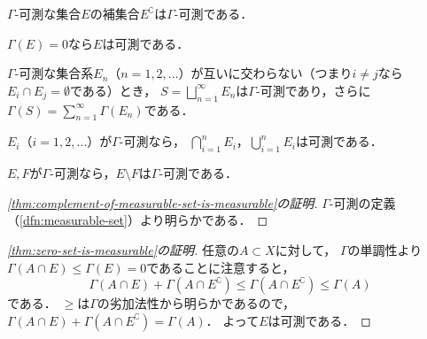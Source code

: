 \documentclass[../sotsu.tex]{subfiles}
\begin{document}
\begin{proposition}
    \label{thm:complement-of-measurable-set-is-measurable}
    $Γ$-可測な集合$E$の補集合$E^{\complement}$は$Γ$-可測である．
\end{proposition}


\begin{proposition}
    \label{thm:zero-set-is-measurable}
    $Γ (E) = 0$なら$E$は可測である．
\end{proposition}


\begin{proposition}
    \label{thm:disjoint-union-of-measurable-sets-is-measurable}
    $Γ$-可測な集合系$E_n$（$n = 1, 2, \dots$）が互いに交わらない（つまり$i \neq j$なら$E_i \cap E_j = \emptyset$である）とき，
    $S = \bigsqcup_{n=1}^{\infty} E_n$は$Γ$-可測であり，さらに$Γ(S) = \sum_{n=1}^{\infty} Γ(E_n)$である\cite[定理5.3]{ito-lebesgue-1963}．
\end{proposition}


\begin{proposition}
    \label{thm:finite-union-and-intersection-of-measurable-sets-are-measurable}
    $E_i$（$i = 1, 2, \dots$）が$Γ$-可測なら，
    $\bigcap_{i=1}^{n} E_i$，$\bigcup_{i=1}^{n} E_i$は可測である．
\end{proposition}


\begin{corollary}
    \label{thm:countable-set-minus-countable-set-is-countable}
    $E, F$が$Γ$-可測なら，$E \setminus F$は$Γ$-可測である．
\end{corollary}




\begin{proof}[\cref{thm:complement-of-measurable-set-is-measurable}の証明]
    $Γ$-可測の定義（\cref{dfn:measurable-set}）より明らかである．
\end{proof}

\begin{proof}[\cref{thm:zero-set-is-measurable}の証明]
    任意の$A \subset X$に対して，
    $Γ$の単調性より$Γ (A \cap E) \leq Γ (E) = 0$であることに注意すると，
    \[
        Γ (A \cap E) + Γ (A \cap E^{\complement})
        \leq Γ (A \cap E^{\complement})
        \leq Γ (A)
    \]
    である．
    $\geq$は$Γ$の劣加法性から明らかであるので，
    $Γ (A \cap E) + Γ (A \cap E^{\complement}) = Γ (A)$．
    よって$E$は可測である．
\end{proof}
\end{document}
